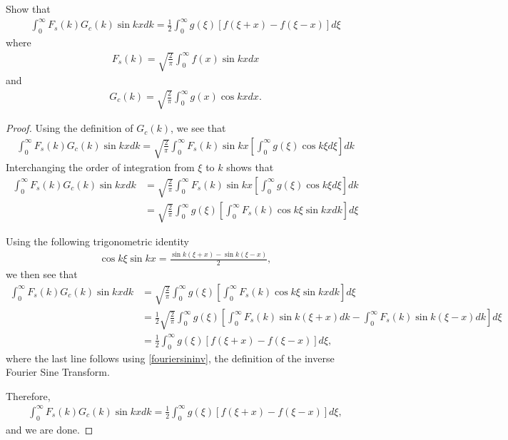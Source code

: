 \begin{problem}{4}
  Show that
  \begin{align*}
    \int_0^\infty F_s(k) G_c(k) \sin kx dk = \frac{1}{2}\int_0^\infty g(\xi) \left[f(\xi + x) - f(\xi - x)\right]d\xi
  \end{align*}
  where
  \begin{align*}
    F_s(k) = \sqrt{\frac{2}{\pi}}\int_0^\infty f(x) \sin kx dx
  \end{align*}
  and
  \begin{align*}
    G_c(k) = \sqrt{\frac{2}{\pi}}\int_0^\infty g(x) \cos kx dx.
  \end{align*}
\end{problem}

\begin{proof}
  Using the definition of $G_c(k)$, we see that
  \begin{align*}
    \int_0^\infty F_s(k) G_c(k) \sin kx dk = \sqrt{\frac{2}{\pi}}\int_0^\infty F_s(k) \sin kx\left[\int_0^\infty g(\xi) \cos k\xi d\xi\right] dk
  \end{align*}
  Interchanging the order of integration from $\xi$ to $k$ shows that
  \begin{align*}
    \int_0^\infty F_s(k) G_c(k) \sin kx dk &= \sqrt{\frac{2}{\pi}}\int_0^\infty F_s(k) \sin kx\left[\int_0^\infty g(\xi) \cos k\xi d\xi\right] dk \\
    &= \sqrt{\frac{2}{\pi}}\int_0^\infty g(\xi) \left[\int_0^\infty F_s(k) \cos k\xi\sin kx dk\right] d\xi
  \end{align*}

  Using the following trigonometric identity
  \begin{align*}
    \cos k \xi \sin k x = \frac{\sin k(\xi + x)-\sin k (\xi -x)}{2},
  \end{align*}
  we then see that
  \begin{align*}
    \int_0^\infty F_s(k) G_c(k) \sin kx dk
    &= \sqrt{\frac{2}{\pi}}\int_0^\infty g(\xi) \left[\int_0^\infty F_s(k) \cos k\xi\sin kx dk\right] d\xi \\
    &= \frac{1}{2}\sqrt{\frac{2}{\pi}}\int_0^\infty g(\xi) \left[\int_0^\infty F_s(k)\sin k(\xi + x) dk - \int_0^\infty F_s(k)\sin k(\xi - x) dk\right] d\xi \\
    &= \frac{1}{2}\int_0^\infty g(\xi) \left[f(\xi+x)-f(\xi-x)\right]d\xi,
  \end{align*}
  where the last line follows using \eqref{fouriersininv}, the definition of the inverse Fourier Sine Transform.

  Therefore,
  \begin{align*}
    \int_0^\infty F_s(k) G_c(k) \sin kx dk
    = \frac{1}{2}\int_0^\infty g(\xi) \left[f(\xi+x)-f(\xi-x)\right]d\xi,
  \end{align*}
  and we are done.

\end{proof}
\newpage
